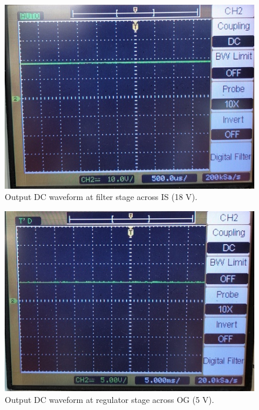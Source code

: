 \documentclass[journal,12pt,twocolumn]{IEEEtran}
\begin{document}
\begin{figure}[!ht]
	\includegraphics[width=\columnwidth]{figs/filter.jpg}
	\caption{Output DC waveform at filter stage across IS (18 V).}
	\label{fig:filter}
\end{figure}

\begin{figure}[!ht]
	\includegraphics[width=\columnwidth]{figs/regulator_dc.jpg}
	\caption{Output DC waveform at regulator stage across OG (5 V).}
	\label{fig:regulator_dc}
\end{figure}
\end{document}
